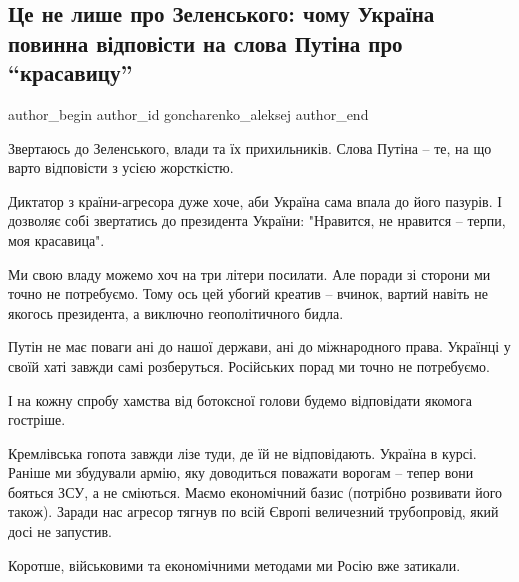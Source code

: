  
 
 
 
 
 
\subsection{Це не лише про Зеленського: чому Україна повинна відповісти на слова Путіна про \enquote{красавицу}}
\label{sec:08_02_2022.stz.news.ua.pravda.1.putin_krasavica}
 
\ifcmt
 author_begin
   author_id goncharenko_aleksej
 author_end
\fi

Звертаюсь до Зеленського, влади та їх прихильників. Слова Путіна – те, на що
варто відповісти з усією жорсткістю.

Диктатор з країни-агресора дуже хоче, аби Україна сама впала до його пазурів. І
дозволяє собі звертатись до президента України: "Нравится, не нравится – терпи,
моя красавица".

Ми свою владу можемо хоч на три літери посилати. Але поради зі сторони ми точно
не потребуємо. Тому ось цей убогий креатив – вчинок, вартий навіть не якогось
президента, а виключно геополітичного бидла.

Путін не має поваги ані до нашої держави, ані до міжнародного права. Українці у
своїй хаті завжди самі розберуться. Російських порад ми точно не потребуємо.

І на кожну спробу хамства від ботоксної голови будемо відповідати якомога
гостріше.

Кремлівська гопота завжди лізе туди, де їй не відповідають. Україна в курсі.
Раніше ми збудували армію, яку доводиться поважати ворогам – тепер вони бояться
ЗСУ, а не сміються. Маємо економічний базис (потрібно розвивати його також).
Заради нас агресор тягнув по всій Європі величезний трубопровід, який досі не
запустив.

Коротше, військовими та економічними методами ми Росію вже затикали.

